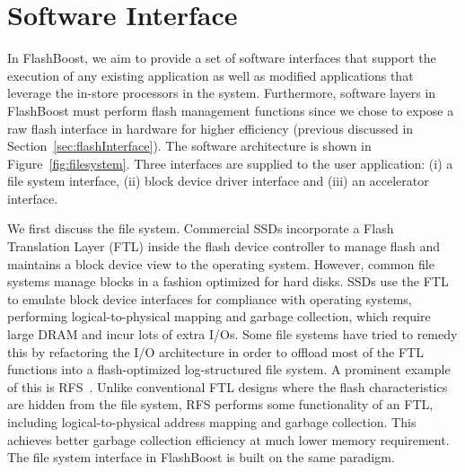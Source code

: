 \section{Software Interface}
\label{sec:software}

In FlashBoost, we aim to provide a set of software interfaces that support the
execution of any existing application as well as modified applications that
leverage the in-store processors in the system. Furthermore, software layers in
FlashBoost must perform flash management functions since we chose to expose a
raw flash interface in hardware for higher efficiency (previous discussed in
Section~\ref{sec:flashInterface}). The software architecture is shown in
Figure~\ref{fig:filesystem}.  Three interfaces are supplied to the user
application: (i) a file system interface, (ii) block device driver interface
and (iii) an accelerator interface. 


We first discuss the file system. Commercial SSDs incorporate a Flash
Translation Layer (FTL) inside the flash device controller to manage flash and
maintains a block device view to the operating system.  However, common file
systems manage blocks in a fashion optimized for hard disks.  SSDs use
the FTL to emulate block device interfaces for compliance with operating systems, performing
logical-to-physical mapping and garbage collection, which require large DRAM
and incur lots of extra I/Os. Some file systems have tried to remedy this by
refactoring the I/O architecture in order to offload most of the FTL functions
into a flash-optimized log-structured file system. A prominent example of this
is RFS~\cite{rfs}.  Unlike conventional FTL designs where the flash
characteristics are hidden from the file system, RFS performs some
functionality of an FTL, including logical-to-physical address mapping and
garbage collection.  This achieves better garbage collection efficiency at much
lower memory requirement. The file system interface in FlashBoost is built on
the same paradigm. 

